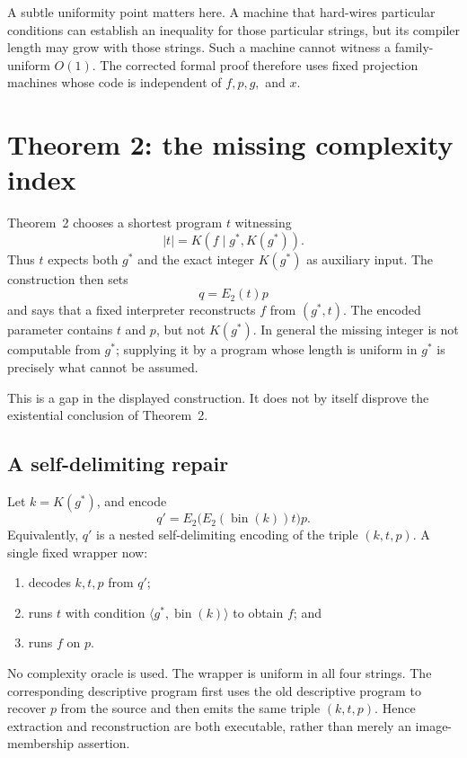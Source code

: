 \documentclass[11pt]{article}
\newcommand{\bits}[1]{\lvert #1\rvert}
\newcommand{\pair}[2]{\langle #1,#2\rangle}
\newcommand{\K}{K}
\newcommand{\Etwo}{E_2}
\begin{document}
A subtle uniformity point matters here.  A machine that hard-wires particular
conditions can establish an inequality for those particular strings, but its
compiler length may grow with those strings.  Such a machine cannot witness a
family-uniform $O(1)$.  The corrected formal proof therefore uses fixed
projection machines whose code is independent of $f,p,g,$ and $x$.

\section{Theorem 2: the missing complexity index}

Theorem~2 chooses a shortest program $t$ witnessing
\[
  \bits t=\K(f\mid g^*,\K(g^*)).
\]
Thus $t$ expects both $g^*$ and the exact integer $\K(g^*)$ as auxiliary
input.  The construction then sets
\[
  q=\Etwo(t)p
\]
and says that a fixed interpreter reconstructs $f$ from $(g^*,t)$.  The
encoded parameter contains $t$ and $p$, but not $\K(g^*)$.  In general the
missing integer is not computable from $g^*$; supplying it by a program whose
length is uniform in $g^*$ is precisely what cannot be assumed.

This is a gap in the displayed construction.  It does not by itself disprove
the existential conclusion of Theorem~2.

\subsection{A self-delimiting repair}

Let $k=\K(g^*)$, and encode
\[
  q'=\Etwo\bigl(\Etwo(\operatorname{bin}(k))t\bigr)p.
\]
Equivalently, $q'$ is a nested self-delimiting encoding of the triple
$(k,t,p)$.  A single fixed wrapper now:

\begin{enumerate}
  \item decodes $k,t,p$ from $q'$;
  \item runs $t$ with condition $\pair{g^*}{\operatorname{bin}(k)}$ to obtain
        $f$; and
  \item runs $f$ on $p$.
\end{enumerate}

No complexity oracle is used.  The wrapper is uniform in all four strings.
The corresponding descriptive program first uses the old descriptive program
to recover $p$ from the source and then emits the same triple $(k,t,p)$.
Hence extraction and reconstruction are both executable, rather than merely
an image-membership assertion.
\end{document}
